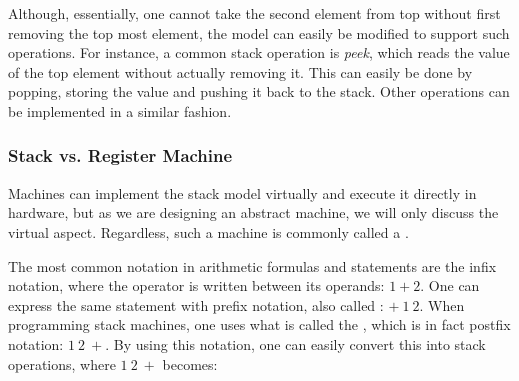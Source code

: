 

Although, essentially, one cannot take the second element from top without first
removing the top most element, the model can easily be modified to support such
operations. For instance, a common stack operation is {\it peek}, which reads
the value of the top element without actually removing it. This can easily be
done by popping, storing the value and pushing it back to the stack. Other
operations can be implemented in a similar fashion. %

\subsubsection{Stack vs. Register Machine}
Machines can implement the stack model virtually and execute it directly in
hardware, but as we are designing an abstract machine, we will only discuss the
virtual aspect. Regardless, such a machine is commonly called a .

The most common notation in arithmetic formulas and statements are the infix
notation, where the operator is written between its operands: $1 + 2$. One can
express the same statement with prefix notation, also called : $+\ 1\ 2$. When programming stack machines, one uses what is called
the , which is in fact postfix notation:
$1\ 2\ +$. By using this notation, one can easily convert this into stack
operations, where $1\ 2\ +$ becomes:
\begin{stackops}
\end{stackops}

